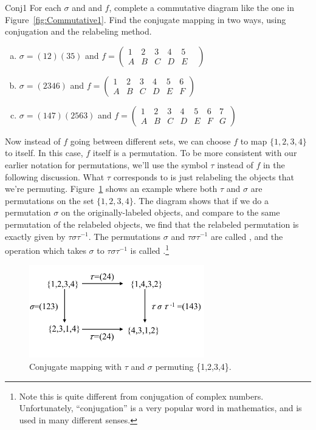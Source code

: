 \begin{exercise}{Conj1}
For each $\sigma$ and and $f$, complete a commutative diagram like the one in Figure~\ref{fig:Commutative1}. Find the conjugate mapping in two ways, using conjugation and the relabeling method.
\begin{enumerate}[(a)]
\item $\sigma=(12)(35)$ and $f=\begin{pmatrix} 1&2&3&4&5\\ A&B&C&D&E& \end{pmatrix} $
\item $\sigma=(2346)$ and $f=\begin{pmatrix} 1&2&3&4&5&6\\ A&B&C&D&E&F \end{pmatrix}$
\item $\sigma=(147)(2563)$ and $f=\begin{pmatrix} 1&2&3&4&5&6&7\\ A&B&C&D&E&F&G \end{pmatrix}$
\end{enumerate}
\end {exercise}
Now instead of $f$ going between different sets, we can choose $f$ to map $\{1,2,3,4\}$ to itself. In this case, $f$ itself is a permutation.  To be more consistent with our earlier notation for permutations, we'll use the symbol $\tau$ instead of $f$ in the following discussion.  What $\tau$ corresponds to is just relabeling the objects that we're permuting. Figure~\ref{fig:Commutative2} shows an example where both $\tau$ and $\sigma$ are permutations on the set $\{1,2,3,4\}$. The diagram shows that if we do a permutation $\sigma$ on the originally-labeled objects, and compare to the same permutation of the relabeled objects, we find that the relabeled permutation is exactly given by $\tau\sigma \tau^{-1}$. The permutations $\sigma$ and $\tau\sigma \tau^{-1}$ are called , and the operation which takes $\sigma$ to $\tau \sigma \tau^{-1}$ is called .\footnote{Note this is quite different from conjugation of complex numbers. Unfortunately, ``conjugation'' is a very popular word in mathematics, and is used in many different senses.}

\begin{figure}[ht]
\begin{center}
\includegraphics[width=3in]{images/Commutative2.png}
\caption{Conjugate mapping with $\tau$ and $\sigma$ permuting \{1,2,3,4\}.}\label{fig:Commutative2}
\end{center}
\end{figure}

